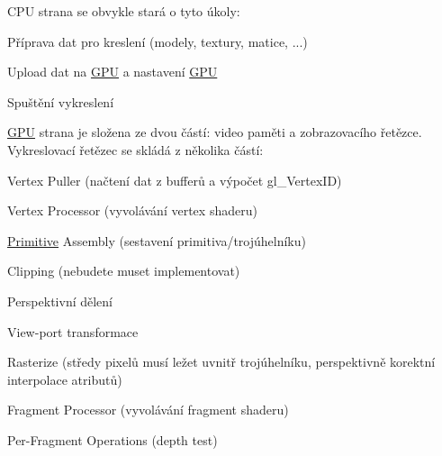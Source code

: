 C\+PU strana se obvykle stará o tyto úkoly\+:
\begin{DoxyItemize}
\item Příprava dat pro kreslení (modely, textury, matice, ...)
\item Upload dat na \hyperlink{structGPU}{G\+PU} a nastavení \hyperlink{structGPU}{G\+PU}
\item Spuštění vykreslení
\end{DoxyItemize}

\hyperlink{structGPU}{G\+PU} strana je složena ze dvou částí\+: video paměti a zobrazovacího řetězce. Vykreslovací řetězec se skládá z několika částí\+:
\begin{DoxyItemize}
\item Vertex Puller (načtení dat z bufferů a výpočet gl\+\_\+\+Vertex\+ID)
\item Vertex Processor (vyvolávání vertex shaderu)
\item \hyperlink{structPrimitive}{Primitive} Assembly (sestavení primitiva/trojúhelníku)
\item Clipping (nebudete muset implementovat)
\item Perspektivní dělení
\item View-\/port transformace
\item Rasterize (středy pixelů musí ležet uvnitř trojúhelníku, perspektivně korektní interpolace atributů)
\item Fragment Processor (vyvolávání fragment shaderu)
\item Per-\/\+Fragment Operations (depth test) ~\newline

\end{DoxyItemize}

